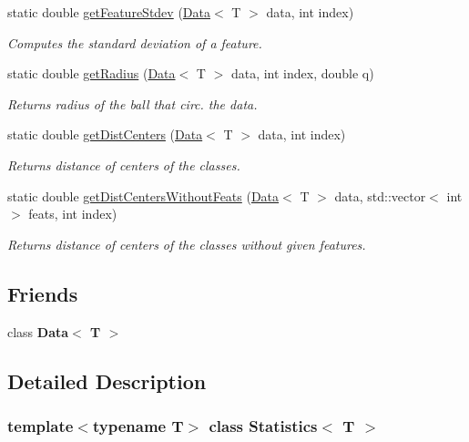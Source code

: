 \begin{DoxyCompactItemize}
static double \hyperlink{class_statistics_abc9b84947508360382100784f43d2b25}{get\+Feature\+Stdev} (\hyperlink{class_data}{Data}$<$ T $>$ data, int index)
\begin{DoxyCompactList}\small\item\em Computes the standard deviation of a feature. \end{DoxyCompactList}\item 
static double \hyperlink{class_statistics_a157fcc6f57bed7b0b353bff8145c5964}{get\+Radius} (\hyperlink{class_data}{Data}$<$ T $>$ data, int index, double q)
\begin{DoxyCompactList}\small\item\em Returns radius of the ball that circ. the data. \end{DoxyCompactList}\item 
static double \hyperlink{class_statistics_ac7673aaf51acf57cfc240cb213f4b30f}{get\+Dist\+Centers} (\hyperlink{class_data}{Data}$<$ T $>$ data, int index)
\begin{DoxyCompactList}\small\item\em Returns distance of centers of the classes. \end{DoxyCompactList}\item 
static double \hyperlink{class_statistics_a781ebfca723e5c57db495635225363e6}{get\+Dist\+Centers\+Without\+Feats} (\hyperlink{class_data}{Data}$<$ T $>$ data, std\+::vector$<$ int $>$ feats, int index)
\begin{DoxyCompactList}\small\item\em Returns distance of centers of the classes without given features. \end{DoxyCompactList}\end{DoxyCompactItemize}
\subsection*{Friends}
\begin{DoxyCompactItemize}
\item 
\mbox{\label{class_statistics_a51b30b6248fac4c53524437ace868c08}} 
class {\bfseries Data$<$ T $>$}
\end{DoxyCompactItemize}


\subsection{Detailed Description}
\subsubsection*{template$<$typename T$>$\newline
class Statistics$<$ T $>$}

